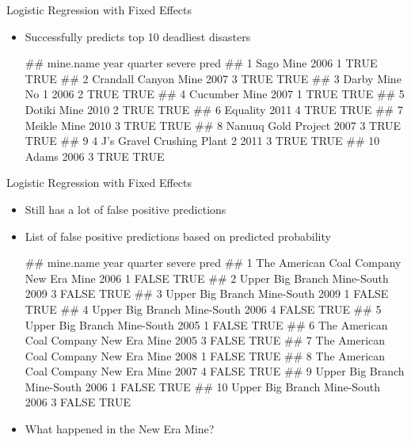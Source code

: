 \documentclass[]{beamer}
\providecommand{\tightlist}{%
  \setlength{\itemsep}{0pt}\setlength{\parskip}{0pt}}
\let\oldverbatim\verbatim
\let\endoldverbatim\endverbatim
\renewenvironment{verbatim}{\footnotesize\oldverbatim}{\endoldverbatim}
\begin{document}
\begin{frame}[fragile]{Logistic Regression with Fixed Effects}

\begin{itemize}[<+->]
\tightlist
\item
  Successfully predicts top 10 deadliest disasters


\begin{verbatim}
##                        mine.name year quarter severe pred
## 1                      Sago Mine 2006       1   TRUE TRUE
## 2           Crandall Canyon Mine 2007       3   TRUE TRUE
## 3                Darby Mine No 1 2006       2   TRUE TRUE
## 4                  Cucumber Mine 2007       1   TRUE TRUE
## 5                    Dotiki Mine 2010       2   TRUE TRUE
## 6                       Equality 2011       4   TRUE TRUE
## 7                    Meikle Mine 2010       3   TRUE TRUE
## 8            Nanuuq Gold Project 2007       3   TRUE TRUE
## 9  4 J's Gravel Crushing Plant 2 2011       3   TRUE TRUE
## 10                         Adams 2006       3   TRUE TRUE
\end{verbatim}
\end{itemize}
\end{frame}

\begin{frame}[fragile]{Logistic Regression with Fixed Effects}

\begin{itemize}[<+->]
\tightlist
\item
  Still has a lot of false positive predictions
\item
  List of false positive predictions based on predicted probability


\begin{verbatim}
##                                 mine.name year quarter severe pred
## 1  The American Coal Company New Era Mine 2006       1  FALSE TRUE
## 2             Upper Big Branch Mine-South 2009       3  FALSE TRUE
## 3             Upper Big Branch Mine-South 2009       1  FALSE TRUE
## 4             Upper Big Branch Mine-South 2006       4  FALSE TRUE
## 5             Upper Big Branch Mine-South 2005       1  FALSE TRUE
## 6  The American Coal Company New Era Mine 2005       3  FALSE TRUE
## 7  The American Coal Company New Era Mine 2008       1  FALSE TRUE
## 8  The American Coal Company New Era Mine 2007       4  FALSE TRUE
## 9             Upper Big Branch Mine-South 2006       1  FALSE TRUE
## 10            Upper Big Branch Mine-South 2006       3  FALSE TRUE
\end{verbatim}

\item
  What happened in the New Era Mine?
\end{itemize}

\end{frame}
\end{document}
